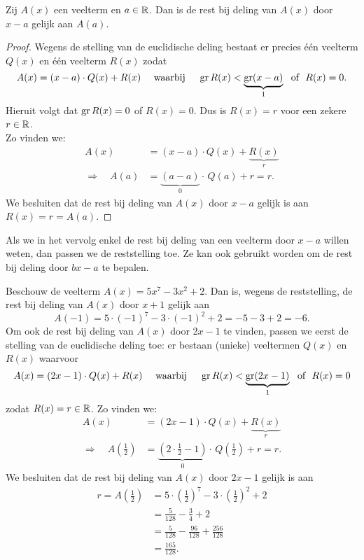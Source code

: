 \documentclass{ximera}
\begin{document}
\begin{theorem}[reststelling]
Zij $A(x)$ een veelterm en $a \in \mathbb{R}$. Dan is de rest bij deling van $A(x)$ door $x-a$ gelijk aan $A(a)$.
\end{theorem}
\begin{proof}
Wegens de stelling van de euclidische deling bestaat er precies  \'e\'en veelterm $Q(x)$ en \'e\'en veelterm $R(x)$ zodat
\[
A(x) = (x-a)\cdot Q(x) + R(x) \quad \text{ waarbij } \quad \operatorname{gr} R(x) < \underbrace{\operatorname{gr} (x-a)}_{1} \,\, \text{ of } \,\, R(x) = 0.
\]
Hieruit volgt dat $\operatorname{gr} R(x) = 0$ of $R(x) = 0$. Dus is $R(x) = r$ voor een zekere $r \in \mathbb{R}$. \\
Zo vinden we:
\begin{align*}
A(x) & = (x-a) \cdot Q(x) + \underbrace{R(x)}_{r} \\
\Rightarrow \quad A(a) & = \underbrace{(a-a)}_{0} \cdot \, Q(a) + r = r. 
\end{align*}
We besluiten dat de rest bij deling van $A(x)$ door $x-a$ gelijk is aan $R(x) = r = A(a)$. 
\end{proof}

Als we in het vervolg enkel de rest bij deling van een veelterm door $x-a$ willen weten, dan passen we de reststelling toe. Ze kan ook gebruikt worden om de rest bij deling door $bx-a$ te bepalen. 

\begin{example}
Beschouw de veelterm $A(x) = 5x^7 - 3x^2 + 2$. Dan is, wegens de reststelling, de rest bij deling van $A(x)$ door $x+1$ gelijk aan
\[
A(-1) = 5 \cdot (-1)^7 - 3 \cdot (-1)^2 + 2 = -5-3+2 = -6.
\]
Om ook de rest bij deling van $A(x)$ door $2x-1$ te vinden, passen we eerst de stelling van de euclidische deling toe: er bestaan (unieke) veeltermen $Q(x)$ en $R(x)$ waarvoor
\[
A(x) = (2x-1)\cdot Q(x) + R(x) \quad \text{ waarbij } \quad \operatorname{gr} R(x) < \underbrace{\operatorname{gr} (2x-1)}_{1} \,\, \text{ of } \,\, R(x) = 0
\]
zodat $R(x) = r \in \mathbb{R}$. Zo vinden we:
\begin{align*}
A(x) & = (2x-1) \cdot Q(x) + \underbrace{R(x)}_{r} \\
\Rightarrow \quad A\left(\frac{1}{2}\right) & = \underbrace{\left(2 \cdot \frac{1}{2}-1\right)}_{0} \cdot \,Q\left(\frac{1}{2}\right) + r = r. 
\end{align*} 
We besluiten dat de rest bij deling van $A(x)$ door $2x-1$ gelijk is aan
\begin{align*}
r = A\left(\frac{1}{2}\right) & = 5 \cdot \left(\frac{1}{2}\right)^7 - 3 \cdot \left(\frac{1}{2}\right)^2 + 2 \\
& = \frac{5}{128} - \frac{3}{4} + 2 \\
& = \frac{5}{128} - \frac{96}{128} + \frac{256}{128} \\
& = \frac{165}{128}.
\end{align*}
\end{example}
\end{document}
